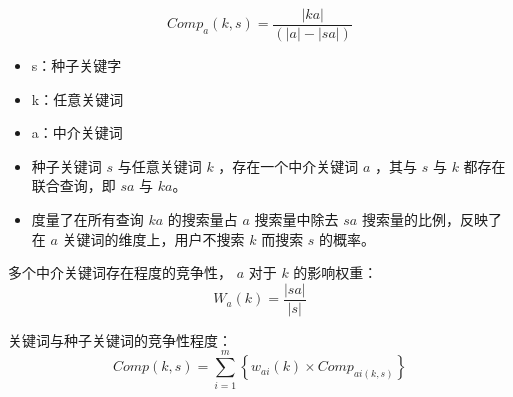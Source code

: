 \documentclass[12pt, a4paper, oneside]{ctexbook}
\begin{document}
    \begin{minipage}{0.4\textwidth}
        \begin{equation*}
            Comp_a\left(k,s\right)=\frac{|{ka}|}{(|{a}|-|{sa}|)}
        \end{equation*}
    \end{minipage}
    \hfill
    \begin{minipage}{0.5\textwidth}
        \begin{itemize}[itemsep=0pt,parsep=0pt,partopsep=0pt,topsep=0pt]
        
            \item s：种子关键字
            \item k：任意关键词
            \item a：中介关键词
        \end{itemize}
    \end{minipage}
    
\vspace{20pt}
\begin{itemize}
    \item 种子关键词 $s$ 与任意关键词 $k$ ，存在一个中介关键词 $a$ ，其与 $s$ 与 $k$ 都存在联合查询，即 $sa$ 与 $ka$。
    \item 度量了在所有查询 $ka$ 的搜索量占 $a$ 搜索量中除去 $sa$ 搜索量的比例，反映了在 $a$ 关键词的维度上，用户不搜索 $k$ 而搜索 $s$ 的概率。
\end{itemize}

多个中介关键词存在程度的竞争性， $a$ 对于 $k$ 的影响权重：
$$W_a(k)=\frac{|{sa}|}{|{s}|}$$

关键词与种子关键词的竞争性程度：
$$Comp(k,s)=\sum_{i=1}^{m}\left\{w_{ai}(k)\times Comp_{ai(k,s)}\right\}$$
\end{document}
